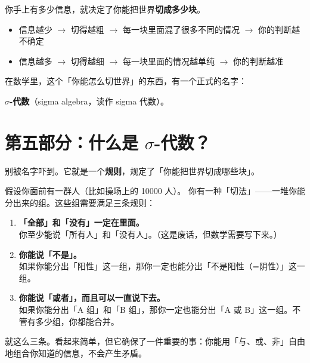 \documentclass[12pt,a4paper]{article}
\begin{document}
\begin{mathbox}[一个重要的概念]
你手上有多少信息，就决定了你能把世界\textbf{切成多少块}。

\begin{itemize}[leftmargin=2em]
  \item 信息越少 $\rightarrow$ 切得越粗 $\rightarrow$ 每一块里面混了很多不同的情况 $\rightarrow$ 你的判断越不确定
  \item 信息越多 $\rightarrow$ 切得越细 $\rightarrow$ 每一块里面的情况越单纯 $\rightarrow$ 你的判断越准
\end{itemize}

在数学里，这个「你能怎么切世界」的东西，有一个正式的名字：\\
\centerline{\textbf{\sffamily\large $\sigma$-代数}（sigma algebra，读作 sigma 代数）。}
\end{mathbox}

\section*{第五部分：什么是 $\sigma$-代数？}

别被名字吓到。它就是一个\textbf{规则}，规定了「你能把世界切成哪些块」。

\begin{ideabox}
假设你面前有一群人（比如操场上的 10000 人）。
你有一种「切法」——一堆你能分出来的组。这些组需要满足三条规则：

\begin{enumerate}[label=\textbf{规则 \arabic*：}, leftmargin=4em]
  \item \textbf{「全部」和「没有」一定在里面。}\\
  你至少能说「所有人」和「没有人」。（这是废话，但数学需要写下来。）

  \item \textbf{你能说「不是」。}\\
  如果你能分出「阳性」这一组，那你一定也能分出「不是阳性（=阴性）」这一组。

  \item \textbf{你能说「或者」，而且可以一直说下去。}\\
  如果你能分出「A 组」和「B 组」，那你一定也能分出「A 或 B」这一组。不管有多少组，你都能合并。
\end{enumerate}
\end{ideabox}

就这么三条。看起来简单，但它确保了一件重要的事：你能用「与、或、非」自由地组合你知道的信息，不会产生矛盾。
\end{document}
